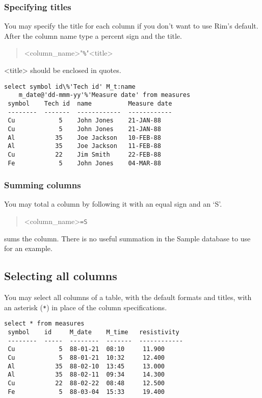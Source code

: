 \documentclass[11pt,a4paper]{report}
\def\I{\index}
\begin{document}
 
\subsubsection{Specifying titles}
\I{title}
You may specify the title for each column if you don't want to use
Rim's default. After the column name type a percent sign and the title.
\begin{verse}
<column\_name>"\verb!%!"<title>
\end{verse}
<title> should be enclosed in quotes.
 
\begin{verbatim}
select symbol id\%'Tech id' M_t:name  
    m_date@'dd-mmm-yy'%'Measure date' from measures
 symbol    Tech id  name          Measure date
 --------  -------  ------------  ------------
 Cu            5    John Jones    21-JAN-88
 Cu            5    John Jones    21-JAN-88
 Al           35    Joe Jackson   10-FEB-88
 Al           35    Joe Jackson   11-FEB-88
 Cu           22    Jim Smith     22-FEB-88
 Fe            5    John Jones    04-MAR-88
\end{verbatim}
 
\subsubsection{Summing columns}
\I{sum}
You may total a column by following it with an equal sign and an `S'.
\begin{verse}
<column\_name>\verb!=S!
\end{verse}
sums the column.
There is no useful summation in the Sample database
to use for an example.
 
\subsection{Selecting all columns}
\I{*}
You may select all columns of a table, with the default formats
and titles, with an asterisk (\verb!*!) in place of the column specifications.
\begin{verbatim}
select * from measures
 symbol    id     M_date    M_time   resistivity
 --------  -----  --------  -------  ------------
 Cu            5  88-01-21  08:10     11.900
 Cu            5  88-01-21  10:32     12.400
 Al           35  88-02-10  13:45     13.000
 Al           35  88-02-11  09:34     14.300
 Cu           22  88-02-22  08:48     12.500
 Fe            5  88-03-04  15:33     19.400
\end{verbatim}
 
\end{document}
